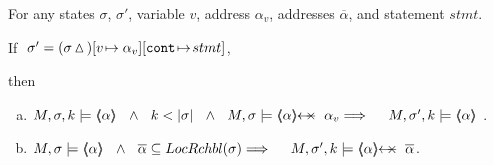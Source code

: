 \begin{lemma}
\label{l:aux:called:caller}

For any   states $\sigma$, $\sigma'$,  variable  $v$,  address  $\alpha_v$,
addresses  $\overline{\alpha}$,     
and statement $stmt$.

\noindent
 If $\  \sigma'= (\sigma \, {\vartriangle}\,)[v\! \mapsto \alpha_v][\mbox{\normalfont{\texttt{cont}}}\!\mapsto\! stmt] $,\ 
  
\noindent
then

\begin{enumerate} [a.]
\item
\label{l:aux:called:caller:one}
$\satDAssertFrom M  \sigma k  {\inside {\alpha}} \ \  \wedge \ \ k < \DepthSt {\sigma} \ \  \wedge \ \ M, \sigma \models {\protectedFrom \alpha {\alpha_v}}   
 \hfill \Longrightarrow  \ \ \  \   \satDAssertFrom M  {\sigma'} k    {\inside {\alpha}} $ .

  \item
 \label{l:aux:called:caller:two}
 $M, \sigma \models  {\inside {\alpha}}\   \ \wedge\ \  \overline {\alpha} \subseteq \LRelevantO \sigma
 \hfill \Longrightarrow  \ \ \  \  %
 \satDAssertFrom M  {\sigma'} k   {\protectedFrom {\alpha}  {\overline \alpha}}$.

\end{enumerate}
\end{lemma}

